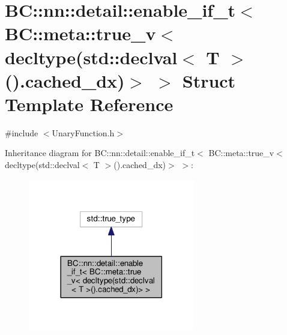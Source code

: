 \hypertarget{structBC_1_1nn_1_1detail_1_1detect__cached__dx_3_01T_00_01std_1_1enable__if__t_3_01BC_1_1meta_1_8a2dd2ab965b5bb3dbd736cde2f6a8b0}{}\section{BC\+:\+:nn\+:\+:detail\+:\+:enable\+\_\+if\+\_\+t$<$ BC\+:\+:meta\+:\+:true\+\_\+v$<$ decltype(std\+:\+:declval$<$ T $>$().cached\+\_\+dx)$>$ $>$ Struct Template Reference}
\label{structBC_1_1nn_1_1detail_1_1detect__cached__dx_3_01T_00_01std_1_1enable__if__t_3_01BC_1_1meta_1_8a2dd2ab965b5bb3dbd736cde2f6a8b0}


{\ttfamily \#include $<$Unary\+Function.\+h$>$}



Inheritance diagram for BC\+:\+:nn\+:\+:detail\+:\+:enable\+\_\+if\+\_\+t$<$ BC\+:\+:meta\+:\+:true\+\_\+v$<$ decltype(std\+:\+:declval$<$ T $>$().cached\+\_\+dx)$>$ $>$\+:
\nopagebreak
\begin{figure}[H]
\begin{center}
\leavevmode
\includegraphics[width=206pt]{structBC_1_1nn_1_1detail_1_1detect__cached__dx_3_01T_00_01std_1_1enable__if__t_3_01BC_1_1meta_1_8eadbae3d82c39c22b6c1e8769207333}
\end{center}
\end{figure}


